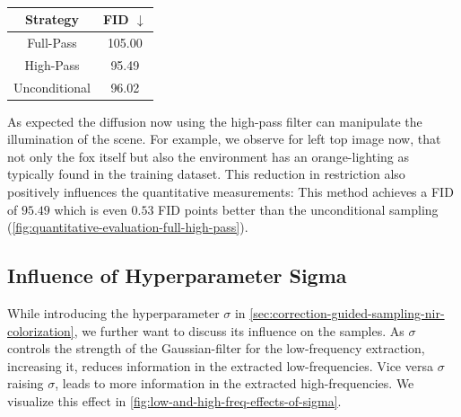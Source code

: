 \begin{table}[htp!]
    \centering
    \begin{tabular}{c | c}
        Strategy      & FID  $\downarrow$ \\
        \hline\hline
        Full-Pass     & 105.00            \\
        High-Pass     & 95.49             \\
        Unconditional & 96.02
    \end{tabular}
    \caption{
    }
    \label{fig:quantitative-evaluation-full-high-pass}
\end{table}


As expected the diffusion now using the high-pass filter can manipulate the illumination of the scene.
For example, we observe for left top image now, that not only the fox itself but also the environment has an orange-lighting as typically found in the training dataset.
This reduction in restriction also positively influences the quantitative measurements:
This method achieves a FID of $95.49$ which is even $0.53$ FID points better than the unconditional sampling (\autoref{fig:quantitative-evaluation-full-high-pass}).



\subsection{Influence of Hyperparameter Sigma}
\label{sec:influence-of-sigma-evaluation}

While introducing the hyperparameter $\sigma$ in \autoref{sec:correction-guided-sampling-nir-colorization}, we further want to discuss its influence on the samples.
As $\sigma$ controls the strength of the Gaussian-filter for the low-frequency extraction, increasing it, reduces information in the extracted low-frequencies.
Vice versa $\sigma$ raising $\sigma$, leads to more information in the extracted high-frequencies.
We visualize this effect in \autoref{fig:low-and-high-freq-effects-of-sigma}.


